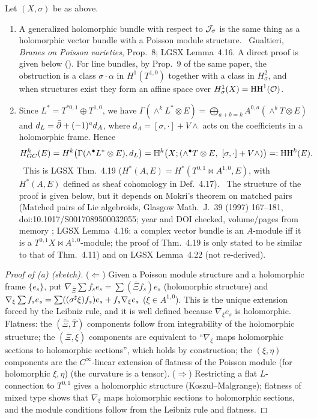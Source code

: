 \begin{prop}[Generalized holomorphic bundles $=$ Poisson modules, and the Dolbeault model]\label{prop:ident}
Let $(X,\sigma)$ be as above.
\begin{enumerate}
\item[(a)] A generalized holomorphic bundle with respect to $\mathcal J_\sigma$ is the same thing as a holomorphic vector bundle with a Poisson module structure. \tC\ Gualtieri, \emph{Branes on Poisson varieties}, Prop.~8; LGSX Lemma~4.16. A direct proof is given below (\tP). For line bundles, by Prop.~9 of the same paper, the obstruction is a class $\sigma\cdot\alpha$ in $H^1(T^{1,0})$ together with a class in $H^2_\sigma$, and when structures exist they form an affine space over $H^1_\sigma(X)=\mathrm{HH}^1(\mathcal O)$. \tC
\item[(b)] Since $L^*=T^{*0,1}\oplus T^{1,0}$, we have $\Gamma(\wedge^kL^*\otimes E)=\bigoplus_{a+b=k}A^{0,a}(\wedge^bT\otimes E)$ and $d_L=\bar\partial+(-1)^ad_A$, where $d_A=[\sigma,\cdot]+V\wedge$ acts on the coefficients in a holomorphic frame. Hence
\[H^k_{GC}(E)=H^k\bigl(\Gamma(\wedge^\bullet L^*\otimes E),d_L\bigr)=\mathbb H^k\bigl(X;(\wedge^\bullet T\otimes E,\ [\sigma,\cdot]+V\wedge)\bigr)=:\HH^k(E).\]
\tC\ This is LGSX Thm.~4.19 ($H^*(A,E)=H^*(T^{0,1}\bowtie A^{1,0},E)$, with $H^*(A,E)$ defined as sheaf cohomology in Def.~4.17). \tP\ The structure of the proof is given below, but it depends on Mokri's theorem on matched pairs (Matched pairs of Lie algebroids, Glasgow Math.\ J.\ 39 (1997) 167--181, doi:10.1017/S0017089500032055; year and DOI checked, volume/pages from memory \tQ; LGSX Lemma~4.16: a complex vector bundle is an $A$-module iff it is a $T^{0,1}X\bowtie A^{1,0}$-module; the proof of Thm.~4.19 is only stated to be similar to that of Thm.~4.11) and on LGSX Lemma~4.22 (not re-derived).
\end{enumerate}
\end{prop}
\begin{proof}[Proof of (a) (sketch)]
($\Leftarrow$) Given a Poisson module structure and a holomorphic frame $\{e_s\}$, put $\nabla_{\bar\Xi}\sum f_se_s=\sum(\bar\Xi f_s)e_s$ (holomorphic structure) and $\nabla_\xi\sum f_se_s=\sum((\sigma^\sharp\xi)f_s)e_s+f_s\nabla_\xi e_s$ ($\xi\in A^{1,0}$). This is the unique extension forced by the Leibniz rule, and it is well defined because $\nabla_\xi e_s$ is holomorphic. Flatness: the $(\bar\Xi,\bar\Upsilon)$ components follow from integrability of the holomorphic structure; the $(\bar\Xi,\xi)$ components are equivalent to ``$\nabla_\xi$ maps holomorphic sections to holomorphic sections'', which holds by construction; the $(\xi,\eta)$ components are the $C^\infty$-linear extension of flatness of the Poisson module (for holomorphic $\xi,\eta$) (the curvature is a tensor).
($\Rightarrow$) Restricting a flat $L$-connection to $T^{0,1}$ gives a holomorphic structure (Koszul--Malgrange); flatness of mixed type shows that $\nabla_\xi$ maps holomorphic sections to holomorphic sections, and the module conditions follow from the Leibniz rule and flatness.\qedhere
\end{proof}
